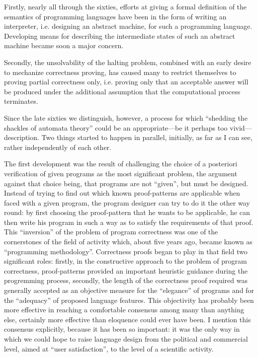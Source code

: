 \documentclass[10pt,letterpaper,twocolumn]{article}
\begin{document}
Firstly, nearly all through the sixties, efforts at giving a formal definition
of the semantics of programming languages have been in the form of writing an
interpreter, i.e. designing an abstract machine, for such a programming
language. Developing means for describing the intermediate states of such an
abstract machine became soon a major concern.

Secondly, the unsolvability of the halting 
problem, combined with an early desire to mechanize correctness proving,
has caused many to restrict themselves to proving partial correctness 
only, i.e. proving only that an acceptable answer 
will be produced under the additional assumption 
that the computational process terminates. 

Since the late sixties we distinguish, however, 
a process for which ``shedding the shackles of automata theory'' could
be an appropriate---be it perhaps too vivid---description. Two things started 
to happen in parallel, initially, as far as I can 
see, rather independently of each other. 

The first development was the result of challenging the choice of a posteriori
verification of given programs as the most significant problem, the argument
against that choice being, that programs are not ``given'', but must be
designed. Instead of trying to find out which known proof-patterns are
applicable when faced with a given program, the program designer can try to do
it the other way round: by first choosing the proof-pattern that he wants to be
applicable, he can then write his program in such a way as to satisfy the
requirements of that proof. This ``inversion'' of the problem of program
correctness was one of the cornerstones of the field of activity which, about
five years ago, became known as ``programming methodology''. Correctness proofs
began to play in that field two significant roles: firstly, in the constructive
approach to the problem of program correctness, proof-patterns provided an
important heuristic guidance during the progremming process, secondly, the
length of the correctness proof required was generally accepted as an objective
measure for the ``elegance'' of programs and for the ``adequacy'' of proposed
language features. This objectivity has probably been more effective in
reaching a comfortable consensus among many than anything else, certainly more
effective than eloquence could ever have been. I mention this consensus
explicitly, because it has been so important: it was the only way in which we
could hope to raise language design from the political and commercial level,
aimed at ``user satisfaction'', to the level of a scientific activity. 
\end{document}
